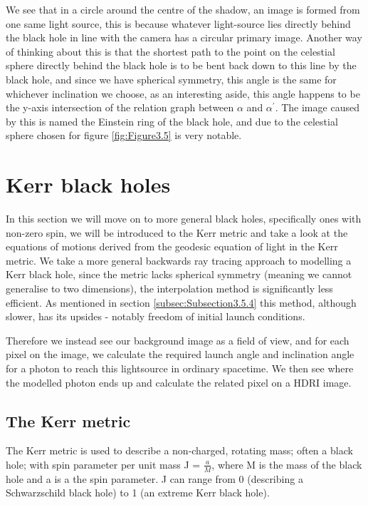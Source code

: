 \documentclass[oneside,openright,frontopenright, singlespacing]{dmathesis}
\begin{document}
\vspace{1em}
	We see that in a circle around the centre of the shadow, an image is formed from one same light source, this is because whatever light-source lies directly behind the black hole in line with the camera has a circular primary image. Another way of thinking about this is that the shortest path to the point on the celestial sphere directly behind the black hole is to be bent back down to this line by the black hole, and since we have spherical symmetry, this angle is the same for whichever inclination we choose, as an interesting aside, this angle happens to be the y-axis intersection of the relation graph between $\alpha$ and $\alpha^{'}$. The image caused by this is named the Einstein ring of the black hole, and due to the celestial sphere chosen for figure \ref{fig:Figure3.5} is very notable.




\chapter{Kerr black holes}\label{chap:Chapter4}

	In this section we will move on to more general black holes, specifically ones with non-zero spin, we will be introduced to the Kerr metric and take a look at the equations of motions derived from the geodesic equation of light in the Kerr metric. We take a more general backwards ray tracing approach to modelling a Kerr black hole, since the metric lacks spherical symmetry (meaning we cannot generalise to two dimensions), the interpolation method is significantly less efficient. As mentioned in section \ref{subsec:Subsection3.5.4} this method, although slower, has its upsides - notably freedom of initial launch conditions.
	
\vspace{1em}
	Therefore we instead see our background image as a field of view, and for each pixel on the image, we calculate the required launch angle and inclination angle for a photon to reach this lightsource in ordinary spacetime. We then see where the modelled photon ends up and calculate the related pixel on a HDRI image.

\section{The Kerr metric}\label{sec:Section4.1}

	The Kerr metric is used to describe a non-charged, rotating mass; often a black hole; with spin parameter per unit mass J = $\frac{a}{M}$, where M is the mass of the black hole and a is a the spin parameter. J can range from 0 (describing a Schwarzschild black hole) to 1 (an extreme Kerr black hole).
\end{document}
